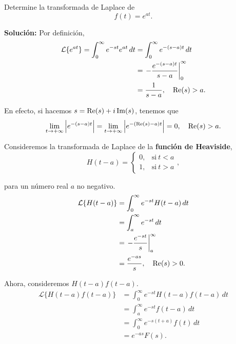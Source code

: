 \begin{ejemplo}
Determine la transformada de Laplace de 
$$f(t) = e^{at}.$$

\textbf{Solución:} Por definición, 
\begin{align*}
    \mathcal{L}\{e^{at}\} = \int_0^{\infty} e^{-st} e^{at} \,dt &= \int_0^{\infty} e^{-(s-a)t} \,dt \\
    &= \left. - \frac{e^{-(s-a)t}}{s-a} \right|_0^{\infty} \\
    &= \frac{1}{s-a}, \quad \operatorname{Re}(s) > a.
\end{align*}

En efecto, si hacemos $s = \operatorname{Re}(s) + i \operatorname{Im}(s)$, tenemos que
$$\lim_{t\to + \infty} \left| e^{-(s-a)t} \right| = \lim_{t\to + \infty} \left|e^{-(\operatorname{Re}(s) - a)t} \right| = 0, \quad \operatorname{Re}(s) > a. $$
\end{ejemplo}

\begin{ejemplo}
    Consideremos la transformada de Laplace de la \textbf{función de Heaviside},
    $$H(t-a) = \left\{ \begin{array}{cl}
     0,& \text{si} ~ t < a  \\
     1,& \text{si} ~ t > a
    \end{array} \right.,$$

    para un número real $a$ no negativo.
    \begin{align*}
        \mathcal{L}\{H(t-a)\} &= \int_0^{\infty} e^{-st} H(t-a) \,dt \\
        &= \int_a^{\infty} e^{-st} \,dt \\
        &= \left. - \frac{e^{-st}}{s}\right|_a^{\infty} \\
        &= \frac{e^{-as}}{s}, \quad \operatorname{Re}(s) > 0.
    \end{align*}

    Ahora, consideremos $H(t-a)f(t-a)$.
    \begin{align*}
        \mathcal{L}\{H(t-a)f(t-a)\} &= \int_0^{\infty} e^{-st} H(t-a)f(t-a) \,dt \\
        &= \int_a^{\infty} e^{-st} f(t-a) \,dt \\
        &= \int_0^{\infty} e^{-s(t+a)} f(t) \,dt \\
        &= e^{-as} F(s).
    \end{align*}

\end{ejemplo}


